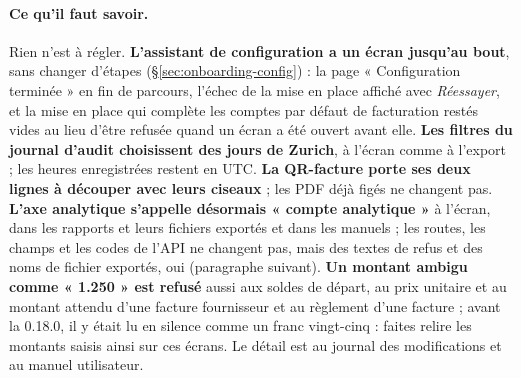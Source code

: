 \documentclass[a4paper,11pt,oneside]{article}
\begin{document}
\paragraph{Ce qu'il faut savoir.} Rien n'est à régler. \textbf{L'assistant de configuration a un écran jusqu'au bout}, sans changer d'étapes (\S\ref{sec:onboarding-config}) : la page « Configuration terminée » en fin de parcours, l'échec de la mise en place affiché avec \emph{Réessayer}, et la mise en place qui complète les comptes par défaut de facturation restés vides au lieu d'être refusée quand un écran a été ouvert avant elle. \textbf{Les filtres du journal d'audit choisissent des jours de Zurich}, à l'écran comme à l'export ; les heures enregistrées restent en UTC. \textbf{La QR-facture porte ses deux lignes à découper avec leurs ciseaux} ; les PDF déjà figés ne changent pas. \textbf{L'axe analytique s'appelle désormais « compte analytique »} à l'écran, dans les rapports et leurs fichiers exportés et dans les manuels ; les routes, les champs et les codes de l'API ne changent pas, mais des textes de refus et des noms de fichier exportés, oui (paragraphe suivant). \textbf{Un montant ambigu comme « 1.250 » est refusé} aussi aux soldes de départ, au prix unitaire et au montant attendu d'une facture fournisseur et au règlement d'une facture ; avant la 0.18.0, il y était lu en silence comme un franc vingt-cinq : faites relire les montants saisis ainsi sur ces écrans. Le détail est au journal des modifications et au manuel utilisateur.
\end{document}
